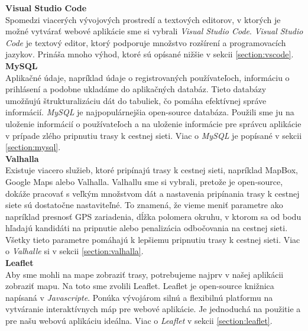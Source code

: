 \noindent\textbf{Visual Studio Code}\\
Spomedzi viacerých vývojových prostredí a textových editorov, v ktorých je možné vytvárať webové aplikácie sme si vybrali \textit{Visual Studio Code}. \textit{Visual Studio Code} je textový editor, ktorý podporuje množstvo rozšírení a programovacích jazykov. Prináša mnoho výhod, ktoré sú opísané nižšie v sekcii \ref{section:vscode}.\\

\noindent\textbf{MySQL}\\
Aplikačné údaje, napríklad údaje o registrovaných používateľoch, informáciu o prihlásení a podobne ukladáme do aplikačných databáz. Tieto databázy umožňujú štrukturalizáciu dát do tabuliek, čo pomáha efektívnej správe informácií. \textit{MySQL} je najpopulárnejšia open-source databáza\cite{mysql}. Použili sme ju na uloženie informácií o používateľoch a na uloženie informácie pre správcu aplikácie v prípade zlého pripnutiu trasy k cestnej sieti. Viac o \textit{MySQL} je popísané v sekcii \ref{section:mysql}.\\

\noindent\textbf{Valhalla}\\
Existuje viacero služieb, ktoré pripínajú trasy k cestnej sieti, napríklad MapBox, Google Maps alebo Valhalla. Valhallu sme si vybrali, pretože je open-source,  dokáže pracovať s veľkým množstvom dát a nastavenia pripínania trasy k cestnej siete sú dostatočne nastaviteľné. To znamená, že vieme meniť parametre ako napríklad presnosť GPS zariadenia, dĺžka polomera okruhu, v ktorom sa od bodu hľadajú kandidáti na pripnutie alebo penalizácia odbočovania na cestnej sieti. Všetky tieto parametre pomáhajú k lepšiemu pripnutiu trasy k cestnej sieti. Viac o \textit{Valhalle} si v sekcii \ref{section:valhalla}.\\

\noindent\textbf{Leaflet}\\
Aby sme mohli na mape zobraziť trasy, potrebujeme najprv v našej aplikácii zobraziť mapu. Na toto sme zvolili Leaflet. Leaflet je open-source knižnica napísaná v \textit{Javascripte}. Ponúka vývojárom silnú a flexibilnú platformu na vytváranie interaktívnych máp pre webové aplikácie. Je jednoduchá na použitie a pre našu webovú aplikáciu ideálna. Viac o \textit{Leaflet} v sekcii \ref{section:leaflet}.
